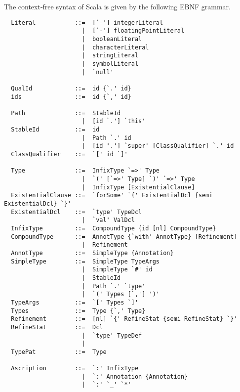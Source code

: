The context-free syntax of Scala is given by the following EBNF
grammar.

{\small
\begin{lstlisting}
  Literal           ::=  [`-'] integerLiteral
                      |  [`-'] floatingPointLiteral
                      |  booleanLiteral
                      |  characterLiteral
                      |  stringLiteral
                      |  symbolLiteral
                      |  `null'

  QualId            ::=  id {`.' id}
  ids               ::=  id {`,' id}

  Path              ::=  StableId
                      |  [id `.'] `this'
  StableId          ::=  id
                      |  Path `.' id
                      |  [id '.'] `super' [ClassQualifier] `.' id
  ClassQualifier    ::=  `[' id `]'

  Type              ::=  InfixType `=>' Type
                      |  `(' [`=>' Type] `)' `=>' Type
                      |  InfixType [ExistentialClause]
  ExistentialClause ::=  `forSome' `{' ExistentialDcl {semi ExistentialDcl} `}'
  ExistentialDcl    ::=  `type' TypeDcl 
                      |  `val' ValDcl
  InfixType         ::=  CompoundType {id [nl] CompoundType}
  CompoundType      ::=  AnnotType {`with' AnnotType} [Refinement]
                      |  Refinement
  AnnotType         ::=  SimpleType {Annotation}
  SimpleType        ::=  SimpleType TypeArgs
                      |  SimpleType `#' id
                      |  StableId
                      |  Path `.' `type'
                      |  `(' Types [`,'] ')'
  TypeArgs          ::=  `[' Types `]'
  Types             ::=  Type {`,' Type}
  Refinement        ::=  [nl] `{' RefineStat {semi RefineStat} `}'
  RefineStat        ::=  Dcl
                      |  `type' TypeDef
                      |
  TypePat           ::=  Type

  Ascription        ::=  `:' InfixType
                      |  `:' Annotation {Annotation} 
                      |  `:' `_' `*'


\end{lstlisting}}
